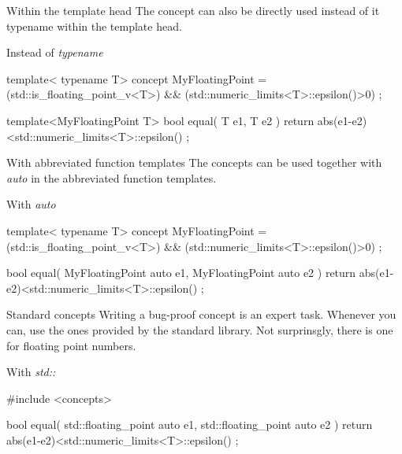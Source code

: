   \begin{frame}[fragile]
    \begin{block}{Within the template head}
        The concept can also be directly used instead of {it typename} within the template head.
    \end{block}
    \begin{exampleblock}{Instead of {\it typename}}
      \begin{cppcode*}{}
      template< typename T>
      concept MyFloatingPoint =
        (std::is_floating_point_v<T>) &&
        (std::numeric_limits<T>::epsilon()>0) ;

      template<MyFloatingPoint T>
      bool equal( T e1, T e2 )
      { return abs(e1-e2)<std::numeric_limits<T>::epsilon() ; }
      \end{cppcode*}
    \end{exampleblock}
  \end{frame}

  \begin{frame}[fragile]
    \begin{block}{With abbreviated function templates}
        The concepts can be used together with {\it auto} in the abbreviated function templates.
    \end{block}
    \begin{exampleblock}{With {\it auto}}
      \begin{cppcode*}{}
      template< typename T>
      concept MyFloatingPoint =
        (std::is_floating_point_v<T>) &&
        (std::numeric_limits<T>::epsilon()>0) ;

      bool equal( MyFloatingPoint auto e1, MyFloatingPoint auto e2 )
      { return abs(e1-e2)<std::numeric_limits<T>::epsilon() ; }
      \end{cppcode*}
    \end{exampleblock}
  \end{frame}

  \begin{frame}[fragile]
    \begin{block}{Standard concepts}
        Writing a bug-proof concept is an expert task.
        Whenever you can, use the ones provided by the standard library.
        Not surprinsgly, there is one for floating point numbers.
    \end{block}
    \begin{exampleblock}{With {\it std::}}
      \begin{cppcode*}{}
      #include <concepts>

      bool equal( std::floating_point auto e1, std::floating_point auto e2 )
      { return abs(e1-e2)<std::numeric_limits<T>::epsilon() ; }
      \end{cppcode*}
    \end{exampleblock}
  \end{frame}

